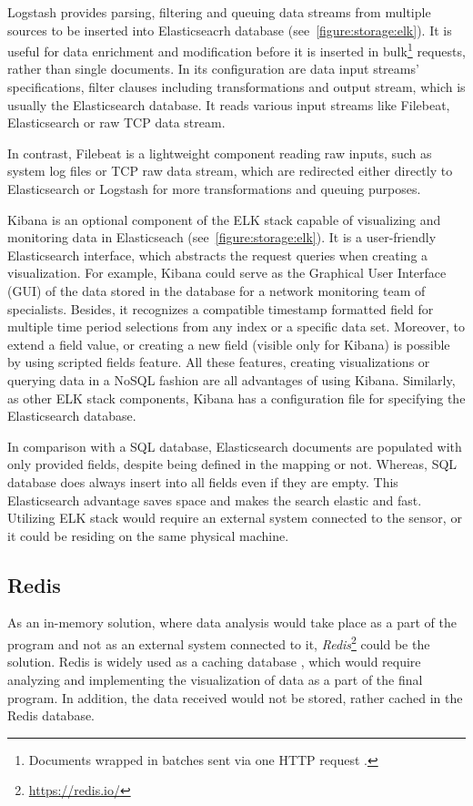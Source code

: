 \documentclass[12pt,a4paper,twoside]{book}
\begin{document}
            Logstash provides parsing, filtering and queuing data streams from multiple sources to be inserted into Elasticseacrh database (see~\autoref{figure:storage:elk}). It is useful for data enrichment and modification before it is inserted in bulk\footnote{Documents wrapped in batches sent via one HTTP request \cite{docs:elastic:bulk}.} requests, rather than single documents. In its configuration are data input streams' specifications, filter clauses including transformations and output stream, which is usually the Elasticsearch database. It reads various input streams like Filebeat, Elasticsearch or raw TCP data stream.\par
            In contrast, Filebeat is a lightweight component reading raw inputs, such as system log files or TCP raw data stream, which are redirected either directly to Elasticsearch or Logstash for more transformations and queuing purposes.\par
            Kibana is an optional component of the ELK stack capable of visualizing and monitoring data in Elasticseach (see~\autoref{figure:storage:elk}). It is a user-friendly Elasticsearch interface, which abstracts the request queries when creating a visualization. For example, Kibana could serve as the Graphical User Interface (GUI) of the data stored in the database for a network monitoring team of specialists. Besides, it recognizes a compatible timestamp formatted field for multiple time period selections from any index or a specific data set. Moreover, to extend a field value, or creating a new field (visible only for Kibana) is possible by using scripted fields feature. All these features, creating visualizations or querying data in a NoSQL fashion are all advantages of using Kibana. Similarly, as other ELK stack components, Kibana has a configuration file for specifying the Elasticsearch database.\par
            In comparison with a SQL database, Elasticsearch documents are populated with only provided fields, despite being defined in the mapping or not. Whereas, SQL database does always insert into all fields even if they are empty. This Elasticsearch advantage saves space and makes the search elastic and fast. Utilizing ELK stack would require an external system connected to the sensor, or it could be residing on the same physical machine.\par
        \subsection{Redis} \label{analysis:storage:redis}
            As an in-memory solution, where data analysis would take place as a part of the program and not as an external system connected to it, \emph{Redis}\footnote{\url{https://redis.io/}} could be the solution. Redis is widely used as a caching database \cite{docs:redis}, which would require analyzing and implementing the visualization of data as a part of the final program. In addition, the data received would not be stored, rather cached in the Redis database.
\end{document}
